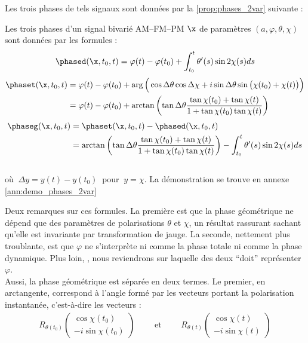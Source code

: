 Les trois phases de tels signaux sont données par la \cref{prop:phases_2var} suivante :
\begin{proposition}\label{prop:phases_2var}
	Les trois phases d'un signal bivarié AM--FM--PM $\x$ de paramètres $(a,\varphi,\theta,\chi)$ sont données par les formules :
	\begin{equation}\label{eq:phased_2var}
		\phased(\x, t_0,t) = \varphi(t) -\varphi(t_0) + \int_{t_0}^t\theta'(s) \sin2\chi(s) ds
	\end{equation}
	\begin{equation}\label{eq:phaset_2var}
	\begin{aligned}
		\phaset(\x,t_0,t) &= \varphi(t)-\varphi(t_0) + \arg\Big(\cos\Delta\theta \cos\Delta\chi + i\sin\Delta\theta \sin\big(\chi(t_0)+\chi(t)\big)\Big) \\
		&= \varphi(t)-\varphi(t_0) + \arctan\left(\tan\Delta\theta \frac{ \tan\chi(t_0)+\tan\chi(t)}{1 + \tan\chi(t_0)\tan\chi(t)}\right)
	\end{aligned}
	\end{equation}
	\begin{equation}\label{eq:phaseg_2var}
	\begin{aligned}
		\phaseg(\x,t_0,t) &= \phaset(\x,t_0,t) - \phased(\x,t_0,t) \\
			&= \arctan\left(\tan\Delta\theta \frac{ \tan\chi(t_0)+\tan\chi(t)}{1 + \tan\chi(t_0)\tan\chi(t)}\right) - \int_{t_0}^t\theta'(s) \sin2\chi(s) ds
	\end{aligned}
	\end{equation}
	\\
	où $\ \Delta y = y(t) - y(t_0)\ $ pour $\ y = \chi$. La démonstration se trouve en annexe \ref{ann:demo_phases_2var}
\end{proposition}
\skipl

Deux remarques sur ces formules. 
La première est que la phase géométrique ne dépend que des paramètres de polarisations $\theta$ et $\chi$, un résultat rassurant sachant qu'elle est invariante par transformation de jauge.
La seconde, nettement plus troublante, est que $\varphi$ ne s'interprète ni comme la phase totale ni comme la phase dynamique. Plus loin, , nous reviendrons sur laquelle des deux ``doit'' représenter $\varphi$.
\\

Aussi, la phase géométrique est séparée en deux termes. Le premier, en arctangente, correspond à l'angle formé par les vecteurs portant la polarisation instantanée, c'est-à-dire les vecteurs :
\begin{align*}
	R_{\theta(t_0)} \begin{pmatrix} \cos\chi(t_0) \\ -i\sin\chi(t_0) \end{pmatrix}\qquad \text{ et }\qquad R_{\theta(t)} \begin{pmatrix} \cos\chi(t) \\ -i\sin\chi(t) \end{pmatrix}
\end{align*}
\\


